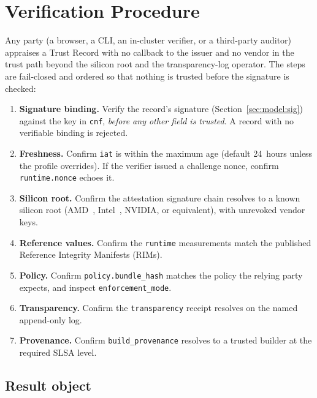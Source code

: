 \section{Verification Procedure}
\label{sec:verification}

Any party (a browser, a CLI, an in-cluster verifier, or a third-party auditor)
appraises a Trust Record with no callback to the issuer and no vendor in the trust
path beyond the silicon root and the transparency-log operator. The steps are
fail-closed and ordered so that nothing is trusted before the signature is checked:

\begin{enumerate}[leftmargin=1.5em]
  \item \textbf{Signature binding.} Verify the record's signature
    (Section~\ref{sec:model:sig}) against the key in \texttt{cnf}, \emph{before any
    other field is trusted}. A record with no verifiable binding is rejected.
  \item \textbf{Freshness.} Confirm \texttt{iat} is within the maximum age (default
    24~hours unless the profile overrides). If the verifier issued a challenge
    nonce, confirm \texttt{runtime.nonce} echoes it.
  \item \textbf{Silicon root.} Confirm the attestation signature chain resolves to a
    known silicon root (AMD~\citep{amdsevsnp2023}, Intel~\citep{inteltdx2023},
    NVIDIA, or equivalent), with unrevoked vendor keys.
  \item \textbf{Reference values.} Confirm the \texttt{runtime} measurements match
    the published Reference Integrity Manifests (RIMs).
  \item \textbf{Policy.} Confirm \texttt{policy.bundle\_hash} matches the policy the
    relying party expects, and inspect \texttt{enforcement\_mode}.
  \item \textbf{Transparency.} Confirm the \texttt{transparency} receipt resolves on
    the named append-only log.
  \item \textbf{Provenance.} Confirm \texttt{build\_provenance} resolves to a
    trusted builder at the required SLSA level.
\end{enumerate}

\subsection{Result object}

